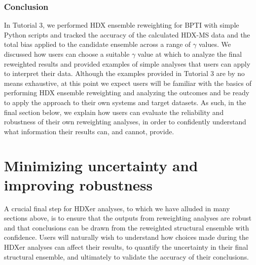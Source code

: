 \documentclass[9pt,tutorial,ASAPversion]{livecoms}
\begin{document}
\subsubsection{Conclusion}

In Tutorial 3, we performed HDX ensemble reweighting for BPTI with simple Python scripts and tracked the accuracy of the calculated HDX-MS data and the total bias applied to the candidate ensemble across a range of $\gamma$ values.
We discussed how users can choose a suitable $\gamma$ value at which to analyze the final reweighted results and provided examples of simple analyses that users can apply to interpret their data.
Although the examples provided in Tutorial 3 are by no means exhaustive, at this point we expect users will be familiar with the basics of performing HDX ensemble reweighting and analyzing the outcomes and be ready to apply the approach to their own systems and target datasets.
As such, in the final section below, we explain how users can evaluate the reliability and robustness of their own reweighting analyses, in order to confidently understand what information their results can, and cannot, provide.

\section{Minimizing uncertainty and improving robustness}\label{robustness_sect}

A crucial final step for HDXer analyses, to which we have alluded in many sections above, is to ensure that the outputs from reweighting analyses are robust and that conclusions can be drawn from the reweighted structural ensemble with confidence.
Users will naturally wish to understand how choices made during the HDXer analyses can affect their results, to quantify the uncertainty in their final structural ensemble, and ultimately to validate the accuracy of their conclusions.
\end{document}

